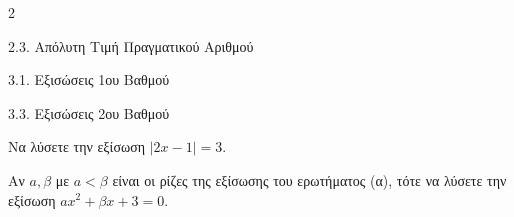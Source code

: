 \begin{ylh}{2}
    \item 2.3. Απόλυτη Τιμή Πραγματικού Αριθμού
    \item 3.1. Εξισώσεις 1ου Βαθμού
    \item 3.3. Εξισώσεις 2ου Βαθμού
\end{ylh}

\begin{alist}
\item Να λύσετε την εξίσωση $|2x - 1| = 3$. 
\item Αν $a, \beta$ με $a < \beta$ είναι οι ρίζες της εξίσωσης του ερωτήματος (α), τότε να λύσετε την εξίσωση $a x^2 + \beta x + 3 = 0$. 
\end{alist}

